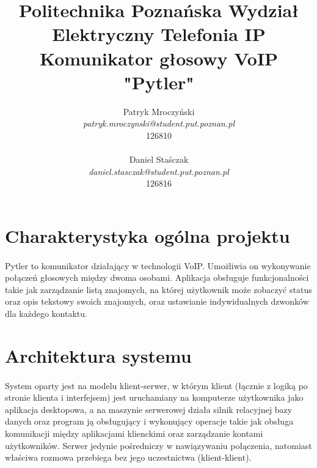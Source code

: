 \documentclass{article}
\title{\Huge{
  \indexspace \textbf{Politechnika Poznańska Wydział Elektryczny}  \indexspace Telefonia IP \indexspace Komunikator głosowy VoIP \indexspace \textbf{"Pytler"}}}
\author{Patryk Mroczyński \\ \textit{patryk.mroczynski@student.put.poznan.pl} \\126810\\
        \\
        Daniel Staśczak \\ \textit{daniel.stasczak@student.put.poznan.pl} \\126816 \\}
\begin{document}
  \maketitle
  \newpage
  \tableofcontents
  \newpage

  \section{Charakterystyka ogólna projektu}
  \paragraph{} Pytler to komunikator działający w technologii VoIP. Umożliwia on wykonywanie połączeń głosowych między dwoma osobami. Aplikacja obsługuje funkcjonalności takie jak zarządzanie listą znajomych, na której użytkownik może zobaczyć status oraz opis tekstowy swoich znajomych, oraz ustawianie indywidualnych dzwonków dla każdego kontaktu.
  \section{Architektura systemu}
  \paragraph{} System oparty jest na modelu klient-serwer, w którym klient (łącznie z logiką po stronie klienta i interfejsem) jest uruchamiany na komputerze użytkownika jako aplikacja desktopowa, a na maszynie serwerowej działa silnik relacyjnej bazy danych oraz program ją obsługujący i wykonujący operacje takie jak obsługa komunikacji między aplikacjami klienckimi oraz zarządzanie kontami użytkowników.
  Serwer jedynie pośredniczy w nawiązywaniu połączenia, natomiast właściwa rozmowa przebiega bez jego uczestnictwa (klient-klient).
\end{document}
